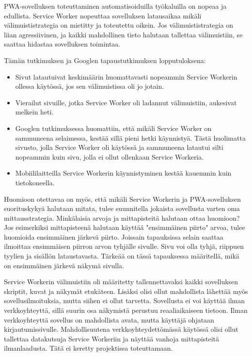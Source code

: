 \documentclass{tktltiki}
\begin{document}
PWA-sovelluksen toteuttaminen automatisoiduilla työkaluilla on nopeaa ja edullista. Service Worker nopeuttaa sovelluksen latausaikaa mikäli välimuististrategia on mietitty ja toteutettu oikein. Jos välimuististrategia on liian agressiivinen, ja kaikki mahdollinen tieto halutaan tallettaa välimuistiin, se saattaa hidastaa sovelluksen toimintaa.

Tämän tutkimuksen ja Googlen tapaustutkimuksen lopputuloksena:

\begin{itemize}
  \item Sivut latautuivat keskimäärin huomattavasti nopeammin Service Workerin ollessa käytössä, jos sen välimuistissa oli jo jotain.
  \item Vierailut sivuille, jotka Service Worker oli ladannut välimuistiin, aukesivat melkein heti.
  \item Googlen tutkimuksessa huomattiin, että mikäli Service Worker on sammuneena selaimessa, kestää sillä pieni hetki käynnistyä. Tästä huolimatta sivusto, jolla Service Worker oli käytössä ja sammuneena latautui silti nopeammin kuin sivu, jolla ei ollut ollenkaan Service Workeria.
  \item Mobiililaitteilla Service Workerin käynnistyminen kestää kauemmin kuin tietokoneella.
\end{itemize}

Huomioon otettavaa on myös, että mikäli Service Workerin ja PWA-sovelluksen suorituskykyä halutaan mitata, tulee suunnitella jokaista sovellusta varten oma mittausstrategia. Minkälaisia arvoja ja mittapisteitä halutaan ottaa huomioon? Jos esimerkiksi mittapisteenä halutaan käyttää "ensimmäinen piirto" arvoa, tulee huomioida ensimmäinen järkevä piirto. Joissain tapauksissa selain saattaa ilmoittaa ensimmäisen piirron arvon tyhjälle sivulle. Sivu voi olla tyhjä, riippuen tyylien ja sisällön lataustavasta. Tärkeää on tässä tapauksessa määritellä, mikä on ensimmäinen järkevä näkymä sivulla.  

Service Workerin välimuistiin oli määritetty tallennettavaksi kaikki sovelluksen skriptit, kuvat ja näkymät etukäteen. Lisäksi olisi ollut mahdollista lähettää myös sovellusilmoituksia, mutta siihen ei ollut tarvetta. Sovellusta ei voi käyttää ilman verkkoyhteyttä, sillä suurin osa näkymistä perustuu reaaliaikaiseen tietoon. Ilman verkkoyhteyttä sovellus on mahdollista avata, mutta käyttäjä ohjataan kirjautumissivulle. Mahdollisuutena verkkoyhteydettömässä käytössä olisi ollut tallettaa datakutsuja Service Workeriin ja näyttää vanhoja mittapisteitä ilmanlaadusta. Tätä ei keretty projektissa toteuttamaan.
\end{document}

